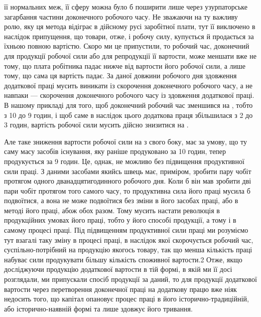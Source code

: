 \parcont{}  %
її нормальних меж, її сферу можна було б поширити лише через
узурпаторське загарбання частини доконечного робочого часу.
Не зважаючи на ту важливу ролю, яку ця метода відіграє в дійсному
русі заробітної плати, тут її виключено в наслідок припущення,
що товари, отже, і робочу силу, купується й продається
за їхньою повною вартістю. Скоро ми це припустили, то робочий
час, доконечний для продукції робочої сили або для репродукції
її вартости, може меншати вже не тому, що плата робітника падає
нижче від вартости його робочої сили, а лише тому, що сама ця
вартість падає. За даної довжини робочого дня здовження додаткової
праці мусить виникати із скорочення доконечного робочого
часу, а не навпаки — скорочення доконечного робочого часу із
здовження додаткової праці. В нашому прикладі для того, щоб
доконечний робочий час зменшився на , тобто з 10 до 9 годин,
і щоб саме в наслідок цього додаткова праця збільшилася з 2 до
3 годин, вартість робочої сили мусить дійсно знизитися на .

Але таке зниження вартости робочої сили на  з свого боку,
має за умову, що ту саму масу засобів існування, яку раніше
продуковано за 10 годин, тепер продукується за 9 годин. Це, однак,
не можливо без підвищення продуктивної сили праці. З даними
засобами якийсь швець має, приміром, зробити пару чобіт
протягом одного дванадцятигодинного робочого дня. Коли б він
мав зробити дві пари чобіт протягом того самого часу, то продуктивна
сила його праці мусила б подвоїтися, а вона не може подвоїтися
без зміни в його засобах праці, або в методі його праці,
абож обох разом. Тому мусить настати революція в продукційних
умовах його праці, тобто у його способі продукції, а тому і в самому
процесі праці. Під підвищенням продуктивної сили праці ми розуміємо
тут взагалі таку зміну в процесі праці, в наслідок якої
скорочується робочий час, суспільно-потрібний на продукцію
якогось товару, так що менша кількість праці набуває сили продукувати
більшу кількість споживної вартости.2 Отже, якщо
досліджуючи продукцію додаткової вартости в тій формі, в якій
ми її досі розглядали, ми припускали спосіб продукції за даний,
то для продукції додаткової вартости через перетворення доконечної
праці на додаткову працю вже ніяк недосить того, що
капітал опановує процес праці в його історично-традиційній,
або історично-наявній формі та лише здовжує його тривання.

